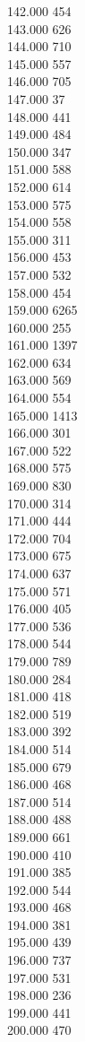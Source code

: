 { 142.000	454 \\
 143.000	626 \\
 144.000	710 \\
 145.000	557 \\
 146.000	705 \\
 147.000	37 \\
 148.000	441 \\
 149.000	484 \\
 150.000	347 \\
 151.000	588 \\
 152.000	614 \\
 153.000	575 \\
 154.000	558 \\
 155.000	311 \\
 156.000	453 \\
 157.000	532 \\
 158.000	454 \\
 159.000	6265 \\
 160.000	255 \\
 161.000	1397 \\
 162.000	634 \\
 163.000	569 \\
 164.000	554 \\
 165.000	1413 \\
 166.000	301 \\
 167.000	522 \\
 168.000	575 \\
 169.000	830 \\
 170.000	314 \\
 171.000	444 \\
 172.000	704 \\
 173.000	675 \\
 174.000	637 \\
 175.000	571 \\
 176.000	405 \\
 177.000	536 \\
 178.000	544 \\
 179.000	789 \\
 180.000	284 \\
 181.000	418 \\
 182.000	519 \\
 183.000	392 \\
 184.000	514 \\
 185.000	679 \\
 186.000	468 \\
 187.000	514 \\
 188.000	488 \\
 189.000	661 \\
 190.000	410 \\
 191.000	385 \\
 192.000	544 \\
 193.000	468 \\
 194.000	381 \\
 195.000	439 \\
 196.000	737 \\
 197.000	531 \\
 198.000	236 \\
 199.000	441 \\
 200.000	470 \\
}
